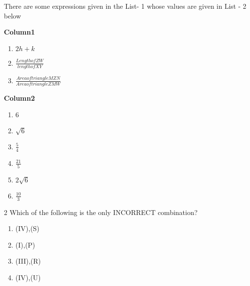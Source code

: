\documentclass[journal,12pt,twocolumn]{IEEEtran}
\theoremstyle{remark}
\begin{document}
There are some expressions given in the List- 1 whose values are given in List - 2 below
\begin{multicols}{2}


	\textbf{Column{1}}

\begin{enumerate}[label=(\Alph*)]

 \item $2h+k$
 \item $\frac{Length of ZW}{length of XY}$
 \item $\frac{Area of triangle MZN}{Area of triangle ZMW}$                     \end{enumerate}                             
 \columnbreak
 \textbf{Column{2}}

 \begin{enumerate}[label=(\alph*) , start=16]                                              
 \item 6                                      
 \item $\sqrt{6}$                              
 \item $\frac{5}{4}$                          
 \item $\frac{21}{5}$                          
 \item $2\sqrt{6}$               
 \item $\frac{10}{3}$                         
 \end{enumerate}     
 \end{multicols}{2}
 Which of the following is the only INCORRECT combination?


\begin{enumerate}[label=(\alph*)] 
 \item (IV),(S)
 \item (I),(P)
 \item (III),(R)    
 \item (IV),(U)
  
  \end{enumerate}
 
 
\end{document}
